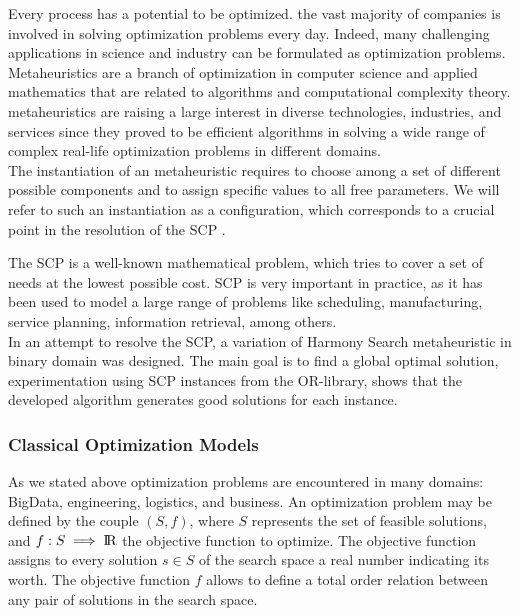 Every process has a potential to be optimized. the vast majority of companies is involved in solving optimization problems every day. Indeed, many challenging applications in science and industry can be formulated as optimization problems.\\

Metaheuristics are a branch of optimization in computer science and applied mathematics that are related to algorithms and computational complexity theory. metaheuristics are raising a large interest in diverse technologies, industries, and services since they proved to be efficient algorithms in solving a wide range of  complex real-life optimization problems in different domains.\\

The instantiation of an metaheuristic requires to choose among a set of different possible components and to assign specific values to all free parameters. We will refer to such an instantiation as a configuration, which corresponds to a crucial point in the resolution of the SCP \cite{DBLP:conf/gecco/BirattariSPV02}.\\

\cite{DBLP:conf/gecco/BirattariSPV02}
\cite{DBLP:conf/gecco/BirattariSPV02}

The SCP is a well-known mathematical problem, which tries to cover a set of needs at the lowest possible cost. SCP is very important in practice, as it has been used to model a large range of problems like scheduling, manufacturing, service planning, information retrieval, among others.\\

In an attempt to resolve the SCP, a variation of Harmony Search metaheuristic in binary domain  was designed. The main goal is to find a global optimal solution, experimentation using SCP instances from the OR-library, shows that the developed algorithm generates good solutions for each instance.

\subsubsection{Classical Optimization Models}
As we stated above optimization problems are encountered in many domains: BigData, engineering, logistics, and business. An optimization problem may be defined by the couple $(S, f )$, where $S$ represents the set of feasible solutions, and $f : S \implies {\rm I\!R}$ the objective function to optimize. The objective function assigns to every solution
$s \in S$ of the search space a real number indicating its worth. The objective function
$f$ allows to define a total order relation between any pair of solutions in the search
space.\\

